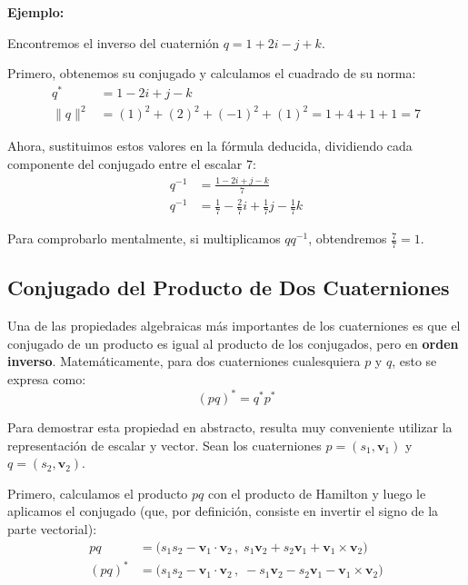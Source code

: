 \textbf{Ejemplo:}

Encontremos el inverso del cuaternión $q = 1 + 2i - j + k$.

Primero, obtenemos su conjugado y calculamos el cuadrado de su norma:
\begin{align*}
    q^* &= 1 - 2i + j - k \\
    \lVert q \rVert^2 &= (1)^2 + (2)^2 + (-1)^2 + (1)^2 = 1 + 4 + 1 + 1 = 7
\end{align*}

Ahora, sustituimos estos valores en la fórmula deducida, dividiendo cada componente del conjugado entre el escalar $7$:
\begin{align*}
    q^{-1} &= \frac{1 - 2i + j - k}{7} \\
    q^{-1} &= \frac{1}{7} - \frac{2}{7}i + \frac{1}{7}j - \frac{1}{7}k
\end{align*}

Para comprobarlo mentalmente, si multiplicamos $q q^{-1}$, obtendremos $\frac{7}{7} = 1$.



\subsection{Conjugado del Producto de Dos Cuaterniones}
Una de las propiedades algebraicas más importantes de los cuaterniones es que el conjugado de un producto es igual al producto de los conjugados, pero en \textbf{orden inverso}. Matemáticamente, para dos cuaterniones cualesquiera $p$ y $q$, esto se expresa como:
\begin{equation}
    (pq)^* = q^* p^*
\end{equation}

Para demostrar esta propiedad en abstracto, resulta muy conveniente utilizar la representación de escalar y vector. Sean los cuaterniones $p = (s_1, \mathbf{v}_1)$ y $q = (s_2, \mathbf{v}_2)$. 

Primero, calculamos el producto $pq$ con el producto de Hamilton y luego le aplicamos el conjugado (que, por definición, consiste en invertir el signo de la parte vectorial):
\begin{align*}
    pq &= \big( s_1 s_2 - \mathbf{v}_1 \cdot \mathbf{v}_2 \, , \; s_1 \mathbf{v}_2 + s_2 \mathbf{v}_1 + \mathbf{v}_1 \times \mathbf{v}_2 \big) \\
    (pq)^* &= \big( s_1 s_2 - \mathbf{v}_1 \cdot \mathbf{v}_2 \, , \; -s_1 \mathbf{v}_2 - s_2 \mathbf{v}_1 - \mathbf{v}_1 \times \mathbf{v}_2 \big)
\end{align*}


